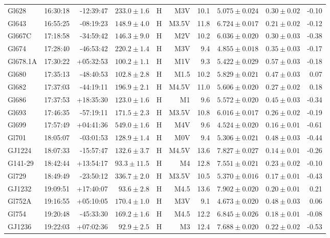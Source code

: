 \documentclass[structabstract]{aa}
\begin{document}
\begin{center}
\begin{longtable}{ l r r r r r r r r r}
Gl628 & 16:30:18 & -12:39:47 & $233.0\pm 1.6$ & H & M3V & 10.1 & $5.075\pm0.024$ & $0.30\pm0.02$ & -0.10 \\
Gl643 & 16:55:25 & -08:19:23 & $148.9\pm 4.0$ & H & M3.5V & 11.8 & $6.724\pm0.017$ & $0.21\pm0.02$ & -0.12 \\
Gl667C & 17:18:58 & -34:59:42 & $146.3\pm 9.0$ & H & M2V & 10.2 & $6.036\pm0.020$ & $0.30\pm0.03$ & -0.38 \\
Gl674 & 17:28:40 & -46:53:42 & $220.2\pm 1.4$ & H & M3V &  9.4 & $4.855\pm0.018$ & $0.35\pm0.03$ & -0.17 \\
Gl678.1A & 17:30:22 & +05:32:53 & $100.2\pm 1.1$ & H & M1V &  9.3 & $5.422\pm0.029$ & $0.57\pm0.03$ & -0.18 \\
Gl680 & 17:35:13 & -48:40:53 & $102.8\pm 2.8$ & H & M1.5 & 10.2 & $5.829\pm0.021$ & $0.47\pm0.03$ & 0.07 \\
Gl682 & 17:37:03 & -44:19:11 & $196.9\pm 2.1$ & H & M4.5V & 11.0 & $5.606\pm0.020$ & $0.27\pm0.02$ & 0.18 \\
Gl686 & 17:37:53 & +18:35:30 & $123.0\pm 1.6$ & H & M1 &  9.6 & $5.572\pm0.020$ & $0.45\pm0.03$ & -0.34 \\
Gl693 & 17:46:35 & -57:19:11 & $171.5\pm 2.3$ & H & M3.5V & 10.8 & $6.016\pm0.017$ & $0.26\pm0.02$ & -0.19 \\
Gl699 & 17:57:49 & +04:41:36 & $549.0\pm 1.6$ & H & M4V &  9.6 & $4.524\pm0.020$ & $0.16\pm0.01$ & -0.61 \\
Gl701 & 18:05:07 & -03:01:53 & $128.9\pm 1.4$ & H & M0V &  9.4 & $5.306\pm0.021$ & $0.48\pm0.03$ & -0.44 \\
GJ1224 & 18:07:33 & -15:57:47 & $132.6\pm 3.7$ & H & M4.5V & 13.6 & $7.827\pm0.027$ & $0.14\pm0.01$ & -0.26 \\
G141-29 & 18:42:44 & +13:54:17 & $93.3\pm11.5$ & H & M4 & 12.8 & $7.551\pm0.021$ & $0.23\pm0.02$ & -0.10 \\
Gl729 & 18:49:49 & -23:50:12 & $336.7\pm 2.0$ & H & M3.5V & 10.5 & $5.370\pm0.016$ & $0.17\pm0.01$ & -0.43 \\
GJ1232 & 19:09:51 & +17:40:07 & $93.6\pm 2.8$ & H & M4.5 & 13.6 & $7.902\pm0.020$ & $0.20\pm0.01$ & 0.21 \\
Gl752A & 19:16:55 & +05:10:05 & $170.4\pm 1.0$ & H & M3V &  9.1 & $4.673\pm0.020$ & $0.48\pm0.03$ & 0.06 \\
Gl754 & 19:20:48 & -45:33:30 & $169.2\pm 1.6$ & H & M4.5 & 12.2 & $6.845\pm0.026$ & $0.18\pm0.01$ & -0.08 \\
GJ1236 & 19:22:03 & +07:02:36 & $92.9\pm 2.5$ & H & M3 & 12.4 & $7.688\pm0.020$ & $0.22\pm0.02$ & -0.53 \\

\end{longtable}
\end{center}
\end{document}

